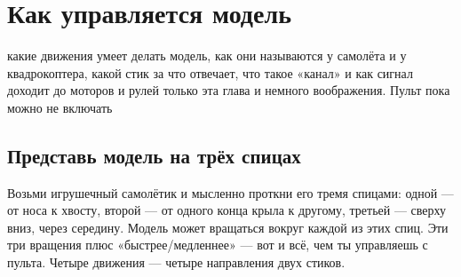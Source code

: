 \chapter{Как управляется модель}
\label{ch:axes}
\chapterintro
  {какие движения умеет делать модель, как они называются у самолёта и у квадрокоптера,
   какой стик за что отвечает, что такое «канал» и как сигнал доходит до моторов и рулей}
  {только эта глава и немного воображения. Пульт пока можно не включать}

\newcommand{\stickpair}[4]{%
\begin{tikzpicture}[scale=0.6,baseline=(c.base)]
  \node (c) at (1.4,0) {};
  \ifdim#1pt=0pt\ifdim#2pt=0pt\pic[transform shape] at (0,0) {stickidle};\else\pic[transform shape] at (0,0) {stickto={#1}{#2}};\fi\else\pic[transform shape] at (0,0) {stickto={#1}{#2}};\fi
  \ifdim#3pt=0pt\ifdim#4pt=0pt\pic[transform shape] at (2.8,0) {stickidle};\else\pic[transform shape] at (2.8,0) {stickto={#3}{#4}};\fi\else\pic[transform shape] at (2.8,0) {stickto={#3}{#4}};\fi
  \node[font=\sffamily\scriptsize,text=black!60] at (0,-1.3) {левый};
  \node[font=\sffamily\scriptsize,text=black!60] at (2.8,-1.3) {правый};
\end{tikzpicture}}

\section{Представь модель на трёх спицах}

\begin{simple}
Возьми игрушечный самолётик и мысленно проткни его тремя спицами: одной --- от носа к хвосту,
второй --- от одного конца крыла к другому, третьей --- сверху вниз, через середину.
Модель может вращаться вокруг каждой из этих спиц. Эти три вращения плюс «быстрее/медленнее»
--- вот и всё, чем ты управляешь с пульта. Четыре движения --- четыре направления двух стиков.
\end{simple}

